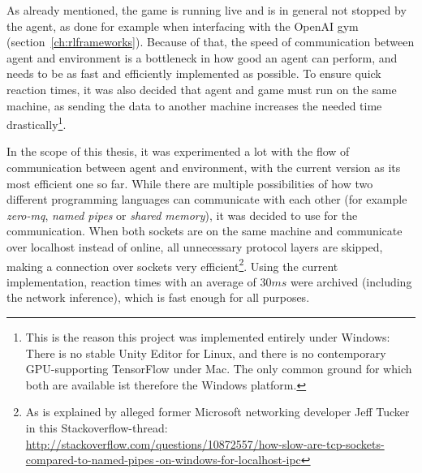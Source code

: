 \label{sec:codeCommunAgent}


As already mentioned, the game is running live and is in general not stopped by the agent, as done for example when interfacing with the OpenAI gym (section~\ref{ch:rlframeworks}). Because of that, the speed of communication between agent and environment is a bottleneck in how good an agent can perform, and needs to be as fast and efficiently implemented as possible. To ensure quick reaction times, it was also decided that agent and game must run on the same machine, as sending the data to another machine increases the needed time drastically\footnote{This is the reason this project was implemented entirely under Windows: There is no stable Unity Editor for Linux, and there is no contemporary GPU-supporting TensorFlow under Mac. The only common ground for which both are available ist therefore the Windows platform.}.

In the scope of this thesis, it was experimented a lot with the flow of communication between agent and environment, with the current version as its most efficient one so far. While there are multiple possibilities of how two different programming languages can communicate with each other (for example \textit{zero-mq}, \textit{named pipes} or \textit{shared memory}), it was decided to use  for the communication. When both sockets are on the same machine and communicate over localhost instead of online, all unnecessary protocol layers are skipped, making a connection over sockets very efficient\footnote{As is explained by alleged former Microsoft networking developer Jeff Tucker in this Stackoverflow-thread: \href{http://stackoverflow.com/questions/10872557/how-slow-are-tcp-sockets-compared-to-named-pipes-on-windows-for-localhost-ipc}{http://stackoverflow.com/questions/10872557/how-slow-are-tcp-sockets-compared-to-named-pipes\,-on-windows-for-localhost-ipc}}. Using the current implementation, reaction times with an average of $30ms$ were archived (including the network inference), which is fast enough for all purposes.

